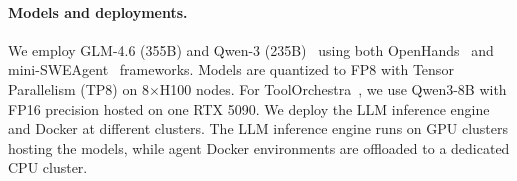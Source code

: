 \paragraph{Models and deployments.}
\vspace{-2mm}
We employ GLM-4.6 (355B) \citep{5team2025glm45agenticreasoningcoding} and Qwen-3 (235B)~\citep{yang2025qwen3technicalreport} using both OpenHands~\citep{wang2025openhandsopenplatformai} and mini-SWEAgent~\citep{yang2024sweagentagentcomputerinterfacesenable} frameworks. Models are quantized to FP8 with Tensor Parallelism (TP8) on 8$\times$H100 nodes. For ToolOrchestra~\citep{su2025toolorchestraelevatingintelligenceefficient}, we use Qwen3-8B with FP16 precision hosted on one RTX 5090. We deploy the LLM inference engine and Docker at different clusters. The LLM inference engine runs on GPU clusters hosting the models, while agent Docker environments are offloaded to a dedicated CPU cluster.



\vspace{-2mm}
